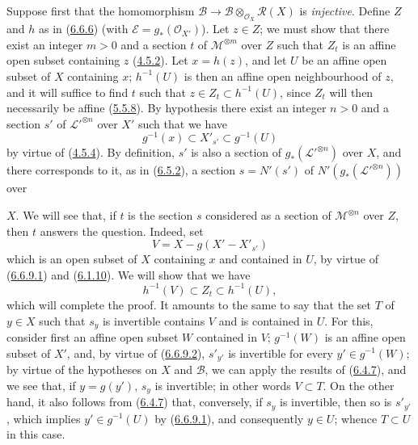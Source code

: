 Suppose first that the homomorphism
$\mathcal{B}\to
\mathcal{B}\otimes_{\mathcal{O}_X}\mathcal{R}(X)$ is \emph{injective}.
Define $Z$ and $h$ as in (\hyperref[II.6.6.6]{6.6.6}) (with
$\mathcal{E}=g_*(\mathcal{O}_{X'})$). Let $z\in Z$; we must show that there
exist an integer $m>0$ and a section $t$ of $\mathcal{M}^{\otimes m}$
over $Z$ such that $Z_t$ is an affine open subset containing $z$
(\hyperref[II.4.5.2]{4.5.2}). Let $x=h(z)$, and let $U$ be an affine open
subset of $X$ containing $x$; $h^{-1}(U)$ is then an affine open
neighbourhood of $z$, and it will suffice to find $t$ such that
$z\in Z_t\subset h^{-1}(U)$, since $Z_t$ will then necessarily be affine
(\hyperref[II.5.5.8]{5.5.8}). By hypothesis there exist an integer $n>0$
and a section $s'$ of ${\mathcal{L}'}^{\otimes n}$ over $X'$ such that
we have
\[
\label{II.6.6.9.1}
g^{-1}(x)\subset X'_{s'}\subset g^{-1}(U)
\tag{6.6.9.1}
\]
by virtue of (\hyperref[II.4.5.4]{4.5.4}). By definition, $s'$ is also a
section of $g_*({\mathcal{L}'}^{\otimes n})$ over $X$, and there
corresponds to it, as in (\hyperref[II.6.5.2]{6.5.2}), a section
$s=N'(s')$ of $N'(g_*({\mathcal{L}'}^{\otimes n}))$ over


$X$. We will see that, if $t$ is the section $s$ considered as a section
of $\mathcal{M}^{\otimes n}$ over $Z$, then $t$ answers the question.
Indeed, set
\[
\label{II.6.6.9.2}
V=X-g(X'-X'_{s'})
\tag{6.6.9.2}
\]
which is an open subset of $X$ containing $x$ and contained in $U$, by
virtue of (\hyperref[II.6.6.9.1]{6.6.9.1}) and
(\hyperref[II.6.1.10]{6.1.10}). We will show that we have
\[
\label{II.6.6.9.3}
h^{-1}(V)\subset Z_t\subset h^{-1}(U),
\tag{6.6.9.3}
\]
which will complete the proof. It amounts to the same to say that the set
$T$ of $y\in X$ such that $s_y$ is invertible contains $V$ and is contained
in $U$. For this, consider first an affine open subset $W$ contained in
$V$; $g^{-1}(W)$ is an affine open subset of $X'$, and, by virtue of
(\hyperref[II.6.6.9.2]{6.6.9.2}), $s'_{y'}$ is invertible for every
$y'\in g^{-1}(W)$; by virtue of the hypotheses on $X$ and $\mathcal{B}$, we
can apply the results of (\hyperref[II.6.4.7]{6.4.7}), and we see that,
if $y=g(y')$, $s_y$ is invertible; in other words $V\subset T$. On the other
hand, it also follows from (\hyperref[II.6.4.7]{6.4.7}) that, conversely,
if $s_y$ is invertible, then so is $s'_{y'}$, which implies
$y'\in g^{-1}(U)$ by (\hyperref[II.6.6.9.1]{6.6.9.1}), and consequently
$y\in U$; whence $T\subset U$ in this case.

